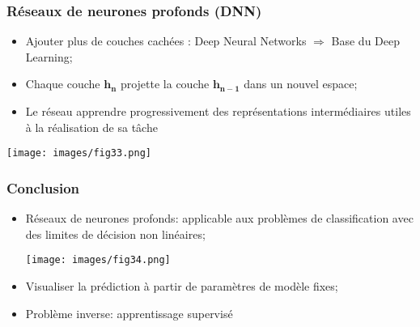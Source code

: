 \documentclass[9pt]{beamer}
\newcommand \ve[1]{\mathbf{#1}}
\begin{document}
\begin{frame}
\frametitle{Réseaux de neurones profonds (DNN)}
\begin{itemize}
\item Ajouter plus de couches cachées : Deep Neural Networks $\Rightarrow$ Base du Deep Learning;
\item Chaque couche $\ve{h_n}$ projette la couche $\ve{h_{n-1}}$ dans un nouvel espace;
\item Le réseau apprendre progressivement des représentations intermédiaires utiles à la réalisation de sa tâche
\end{itemize}
\begin{center}
\texttt{[image: images/fig33.png]}
\end{center}
\end{frame}

\begin{frame}
\frametitle{Conclusion}
\begin{itemize}
\item Réseaux de neurones profonds: applicable aux problèmes de classification avec des limites de décision non linéaires;
\begin{center}
\texttt{[image: images/fig34.png]}
\end{center}
\item Visualiser la prédiction à partir de paramètres de modèle fixes;
\item Problème inverse: apprentissage supervisé
\end{itemize}
\end{frame}
\end{document}
